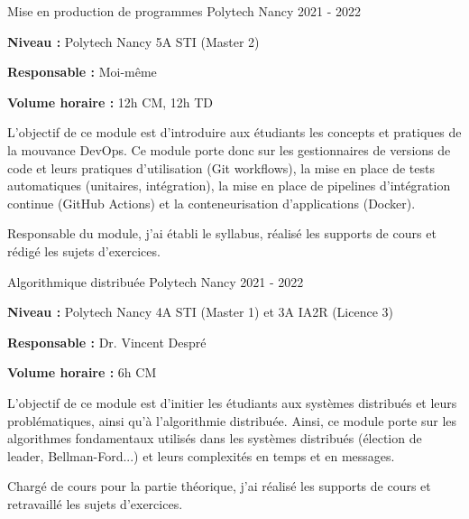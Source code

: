 \documentclass[12pt, a4paper]{awesome-cv}
\begin{document}
\begin{cventries}
  \cventry
  {Mise en production de programmes}
  {Polytech Nancy}
  {}
  {2021 - 2022}
  {
    \begin{cvitems}
      \item {\textbf{Niveau : } Polytech Nancy 5A STI (Master 2)}
      \item {\textbf{Responsable : } Moi-même}
      \item {\textbf{Volume horaire : } 12h CM, 12h TD}
    \end{cvitems}
  }

  \begin{cvparagraph}
    L'objectif de ce module est d'introduire aux étudiants les concepts et pratiques de la mouvance DevOps.
    Ce module porte donc sur les gestionnaires de versions de code et leurs pratiques d'utilisation (Git workflows), la mise en place de tests automatiques (unitaires, intégration), la mise en place de pipelines d'intégration continue (GitHub Actions) et la conteneurisation d'applications (Docker).
  \end{cvparagraph}

  \begin{cvparagraph}
    Responsable du module, j'ai établi le syllabus, réalisé les supports de cours et rédigé les sujets d'exercices.
  \end{cvparagraph}

  \cventry
  {Algorithmique distribuée}
  {Polytech Nancy}
  {}
  {2021 - 2022}
  {
    \begin{cvitems}
      \item {\textbf{Niveau : } Polytech Nancy 4A STI (Master 1) et 3A IA2R (Licence 3)}
      \item {\textbf{Responsable : } Dr. Vincent Despré}
      \item {\textbf{Volume horaire : } 6h CM}
    \end{cvitems}
  }

  \begin{cvparagraph}
    L'objectif de ce module est d'initier les étudiants aux systèmes distribués et leurs problématiques, ainsi qu'à l'algorithmie distribuée.
    Ainsi, ce module porte sur les algorithmes fondamentaux utilisés dans les systèmes distribués (élection de leader, Bellman-Ford...) et leurs complexités en temps et en messages.
  \end{cvparagraph}

  \begin{cvparagraph}
    Chargé de cours pour la partie théorique, j'ai réalisé les supports de cours et retravaillé les sujets d'exercices.
  \end{cvparagraph}


\end{cventries}
\end{document}
